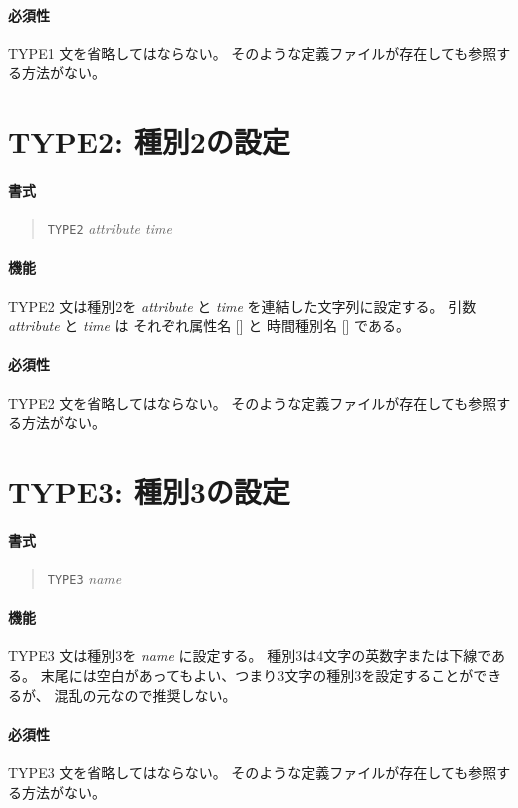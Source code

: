 \paragraph{必須性}
TYPE1 文を省略してはならない。
そのような定義ファイルが存在しても参照する方法がない。

\section{TYPE2: 種別2の設定}
\label{sec:def:TYPE2}
\paragraph{書式}
\begin{quote}
{\tt TYPE2} {\it attribute time}
\end{quote}
\paragraph{機能}
TYPE2 文は種別2を
{\it attribute} と {\it time} を連結した文字列に設定する。
引数 {\it attribute} と {\it time} は
それぞれ属性名 [] と
時間種別名 []
である。
\paragraph{必須性}
TYPE2 文を省略してはならない。
そのような定義ファイルが存在しても参照する方法がない。

\section{TYPE3: 種別3の設定}
\label{sec:def:TYPE3}
\paragraph{書式}
\begin{quote}
{\tt TYPE3} {\it name}
\end{quote}
\paragraph{機能}
TYPE3 文は種別3を {\it name} に設定する。
種別3は4文字の英数字または下線である。
末尾には空白があってもよい、つまり3文字の種別3を設定することができるが、
混乱の元なので推奨しない。
\paragraph{必須性}
TYPE3 文を省略してはならない。
そのような定義ファイルが存在しても参照する方法がない。

